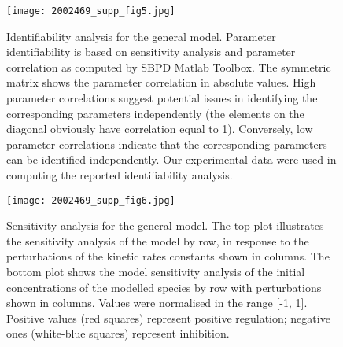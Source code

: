 \begin{figure}[tb]
	\begin{center}
		\texttt{[image: 2002469\_supp\_fig5.jpg]}
		\caption[Identifiability analysis for the general model]{Identifiability analysis for the general model. Parameter identifiability is based on sensitivity analysis and parameter correlation as computed by SBPD Matlab Toolbox. The symmetric matrix shows the parameter correlation in absolute values. High parameter correlations suggest potential issues in identifying the corresponding parameters independently (the elements on the diagonal obviously have correlation equal to 1). Conversely, low parameter correlations indicate that the corresponding parameters can be identified independently. Our experimental data were used in computing the reported identifiability analysis.}
		\label{fig:2002469_supp_fig5}
	\end{center}
\end{figure}
\clearpage

\begin{figure}[tb]
	\begin{center}
		\texttt{[image: 2002469\_supp\_fig6.jpg]}
		\caption[Sensitivity analysis for the general model]{Sensitivity analysis for the general model. The top plot illustrates the sensitivity analysis of the model by row, in response to the perturbations of the kinetic rates constants shown in columns. The bottom plot shows the model sensitivity analysis of the initial concentrations of the modelled species by row with perturbations shown in columns. Values were normalised in the range [-1, 1]. Positive values (red squares) represent positive regulation; negative ones (white-blue squares) represent inhibition.}
		\label{fig:2002469_supp_fig6}
	\end{center}
\end{figure}
\clearpage

